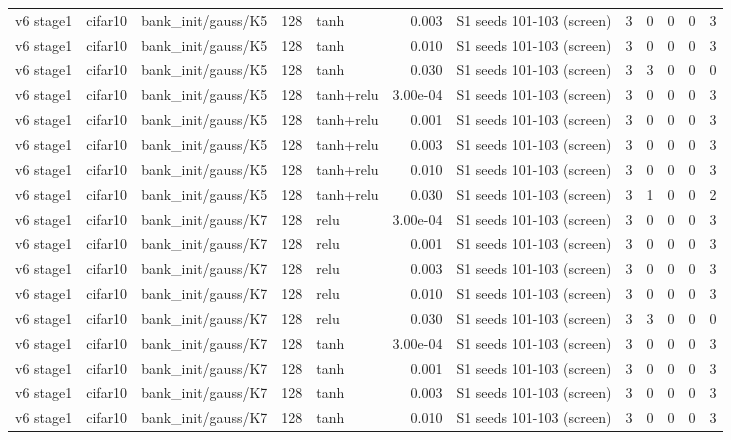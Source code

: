\begin{table}[htbp]
{\begin{tabular}{@{}lllrlrlrrrrr@{}}
v6 stage1 & cifar10 & bank\_init/gauss/K5 & 128 & tanh & 0.003 & S1 seeds 101-103 (screen) & 3 & 0 & 0 & 0 & 3 \\
v6 stage1 & cifar10 & bank\_init/gauss/K5 & 128 & tanh & 0.010 & S1 seeds 101-103 (screen) & 3 & 0 & 0 & 0 & 3 \\
v6 stage1 & cifar10 & bank\_init/gauss/K5 & 128 & tanh & 0.030 & S1 seeds 101-103 (screen) & 3 & 3 & 0 & 0 & 0 \\
v6 stage1 & cifar10 & bank\_init/gauss/K5 & 128 & tanh+relu & 3.00e-04 & S1 seeds 101-103 (screen) & 3 & 0 & 0 & 0 & 3 \\
v6 stage1 & cifar10 & bank\_init/gauss/K5 & 128 & tanh+relu & 0.001 & S1 seeds 101-103 (screen) & 3 & 0 & 0 & 0 & 3 \\
v6 stage1 & cifar10 & bank\_init/gauss/K5 & 128 & tanh+relu & 0.003 & S1 seeds 101-103 (screen) & 3 & 0 & 0 & 0 & 3 \\
v6 stage1 & cifar10 & bank\_init/gauss/K5 & 128 & tanh+relu & 0.010 & S1 seeds 101-103 (screen) & 3 & 0 & 0 & 0 & 3 \\
v6 stage1 & cifar10 & bank\_init/gauss/K5 & 128 & tanh+relu & 0.030 & S1 seeds 101-103 (screen) & 3 & 1 & 0 & 0 & 2 \\
v6 stage1 & cifar10 & bank\_init/gauss/K7 & 128 & relu & 3.00e-04 & S1 seeds 101-103 (screen) & 3 & 0 & 0 & 0 & 3 \\
v6 stage1 & cifar10 & bank\_init/gauss/K7 & 128 & relu & 0.001 & S1 seeds 101-103 (screen) & 3 & 0 & 0 & 0 & 3 \\
v6 stage1 & cifar10 & bank\_init/gauss/K7 & 128 & relu & 0.003 & S1 seeds 101-103 (screen) & 3 & 0 & 0 & 0 & 3 \\
v6 stage1 & cifar10 & bank\_init/gauss/K7 & 128 & relu & 0.010 & S1 seeds 101-103 (screen) & 3 & 0 & 0 & 0 & 3 \\
v6 stage1 & cifar10 & bank\_init/gauss/K7 & 128 & relu & 0.030 & S1 seeds 101-103 (screen) & 3 & 3 & 0 & 0 & 0 \\
v6 stage1 & cifar10 & bank\_init/gauss/K7 & 128 & tanh & 3.00e-04 & S1 seeds 101-103 (screen) & 3 & 0 & 0 & 0 & 3 \\
v6 stage1 & cifar10 & bank\_init/gauss/K7 & 128 & tanh & 0.001 & S1 seeds 101-103 (screen) & 3 & 0 & 0 & 0 & 3 \\
v6 stage1 & cifar10 & bank\_init/gauss/K7 & 128 & tanh & 0.003 & S1 seeds 101-103 (screen) & 3 & 0 & 0 & 0 & 3 \\
v6 stage1 & cifar10 & bank\_init/gauss/K7 & 128 & tanh & 0.010 & S1 seeds 101-103 (screen) & 3 & 0 & 0 & 0 & 3 \\

\end{tabular}}
\end{table}
